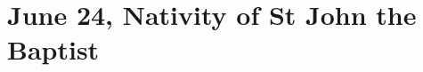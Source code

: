 {{\def\definevesperspropers{
  \def\prepsalmfive{\greseteolcustos{manual}}
}
\def\definevesperspropersalt{}
\def\vesperspropersnote{At II Vespers:}
\def\vesperspropersaltnote{At I Vespers:}
\def\premagverses{\greseteolcustos{manual}}
\def\printfullhymn{
  {\printhymn{\oldstylenums{\hymnlinetwo}}{\hymninitial}{\hymntex}{\hymntranslation}}
  {
    \def\vrlinebreak{T}
    \oldneedspace{3\baselineskip}
    \printnote{\vesperspropersaltnote}
    \definevesperspropersalt
    \printvr[\greseteolcustos{manual}]{\vrtex}{\vtranslation}{\rtranslation}
  }
  \bigskip
  {
    \def\vrlinebreak{T}
    \oldneedspace{3\baselineskip}
    \printnote{\vesperspropersnote}
    \definevesperspropers
    \printvr[\greseteolcustos{manual}]{\vrtex}{\vtranslation}{\rtranslation}
  }
}

\bigskip
\benedicamusdomino{}
}

{
\section{June 24, Nativity of St John the Baptist}
\subtitle{ Class}
\subtitle{I \& II Vespers}

\def\definevesperspropers{
  \def\prepsalmfive{\greseteolcustos{manual}}
}
\def\definevesperspropersalt{}
\def\vesperspropersnote{At II Vespers:}
\def\vesperspropersaltnote{At I Vespers:}
\def\prevesperspsalms{\noindent\printnote{Continue to the chapter on page \pageref{june24-chapter}.\\}}
\def\vesperspsalmslabel{\label{june24-2vespers}}
\def\prevesperspsalmsalt{\noindent\printnote{For II Vespers psalms and antiphons, go to page \pageref{june24-2vespers}.}}
\def\prechapter{\label{june24-chapter}}
\def\premagverses{\greseteolcustos{manual}}
\def\printfullhymn{
  {\printhymn{\oldstylenums{\hymnlinetwo}}{\hymninitial}{\hymntex}{\hymntranslation}}
  {
    \def\vrlinebreak{T}
    \oldneedspace{3\baselineskip}
    \printnote{\vesperspropersaltnote}
    \definevesperspropersalt
    \printvr[\greseteolcustos{manual}]{\vrtex}{\vtranslation}{\rtranslation}
  }
  \bigskip
  {
    \def\vrlinebreak{T}
    \oldneedspace{3\baselineskip}
    \printnote{\vesperspropersnote}
    \definevesperspropers
    \printvr[\greseteolcustos{manual}]{\vrtex}{\vtranslation}{\rtranslation}
  }
}

}}
